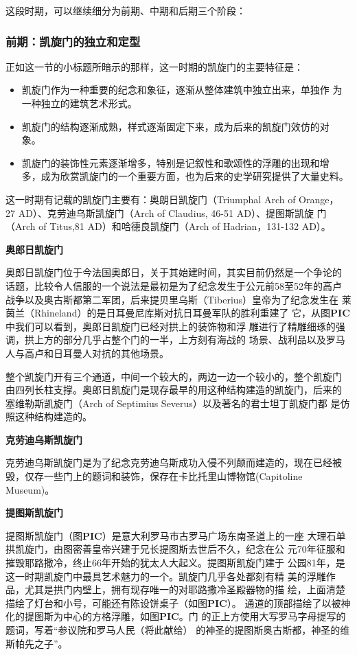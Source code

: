 \documentclass[a4paper,dvipdfm]{article}
\begin{document}
这段时期，可以继续细分为前期、中期和后期三个阶段：

\subsubsection{前期：凯旋门的独立和定型}

正如这一节的小标题所暗示的那样，这一时期的凯旋门的主要特征是：

\begin{itemize}
\item 凯旋门作为一种重要的纪念和象征，逐渐从整体建筑中独立出来，单独作
  为一种独立的建筑艺术形式。
\item 凯旋门的结构逐渐成熟，样式逐渐固定下来，成为后来的凯旋门效仿的对
  象。
\item 凯旋门的装饰性元素逐渐增多，特别是记叙性和歌颂性的浮雕的出现和增
  多，成为欣赏凯旋门的一个重要方面，也为后来的史学研究提供了大量史料。
\end{itemize}

这一时期有记载的凯旋门主要有：奥朗日凯旋门（Triumphal Arch of Orange，
27 AD）、克劳迪乌斯凯旋门（Arch of Claudius, 46-51 AD）、提图斯凯旋
门（Arch of Titus,81 AD）和哈德良凯旋门（Arch of Hadrian，131-132
AD）。


\textbf{奥郎日凯旋门}

奥郎日凯旋门位于今法国奥郎日，关于其始建时间，其实目前仍然是一个争论的
话题，比较令人信服的一个说法是最初是为了纪念发生于公元前58至52年的高卢
战争以及奥古斯都第二军团，后来提贝里乌斯（Tiberius）皇帝为了纪念发生在
莱茵兰（Rhineland）的是日耳曼尼库斯对抗日耳曼军队的胜利重建了
它，从图\textbf{PIC}中我们可以看到，奥郎日凯旋门已经对拱上的装饰物和浮
雕进行了精雕细琢的强调，拱上方的部分几乎占整个门的一半，上方刻有海战的
场景、战利品以及罗马人与高卢和日耳曼人对抗的其他场景。

整个凯旋门开有三个通道，中间一个较大的，两边一边一个较小的，整个凯旋门
由四列长柱支撑。奥郎日凯旋门是现存最早的用这种结构建造的凯旋门，后来的
塞维勒斯凯旋门（Arch of Septimius Severus）以及著名的君士坦丁凯旋门都
是仿照这种结构建造的。

\textbf{克劳迪乌斯凯旋门}

克劳迪乌斯凯旋门是为了纪念克劳迪乌斯成功入侵不列颠而建造的，现在已经被
毁，仅存一些门上的题词和装饰，保存在卡比托里山博物馆(Capitoline
Museum)。

\textbf{提图斯凯旋门}

提图斯凯旋门（图\textbf{PIC}）是意大利罗马市古罗马广场东南圣道上的一座
大理石单拱凯旋门，由图密善皇帝兴建于兄长提图斯去世后不久，纪念在公
元70年征服和摧毁耶路撒冷，终止66年开始的犹太人大起义。提图斯凯旋门建于
公园81年，是这一时期凯旋门中最具艺术魅力的一个。凯旋门几乎各处都刻有精
美的浮雕作品，尤其是拱门内壁上，拥有现存唯一的对耶路撒冷圣殿器物的描
绘，上面清楚描绘了灯台和小号，可能还有陈设饼桌子（如图\textbf{PIC}）。
通道的顶部描绘了以被神化的提图斯为中心的方格浮雕，如图\textbf{PIC}。门
的正上方使用大写罗马字母提写的题词，写着``参议院和罗马人民（将此献给）
的神圣的提图斯奥古斯都，神圣的维斯帕先之子''。
\end{document}
